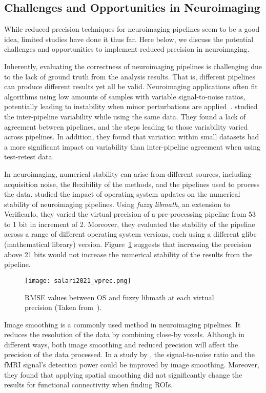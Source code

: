 \subsection{Challenges and Opportunities in Neuroimaging}
While reduced precision techniques for neuroimaging pipelines seem to be a
good idea, limited studies have done it thus far.
Here below, we discuss the potential challenges and opportunities to implement
reduced precision in neuroimaging.
	
Inherently, evaluating the correctness of neuroimaging pipelines is challenging due to the lack of ground truth from the analysis results.
That is, different pipelines can produce different results yet all be valid.
Neuroimaging applications often fit algorithms using low amounts of samples with variable
signal-to-noise ratios, potentially leading to instability when minor perturbations are applied~\cite{Kiar2020-uv}.
\cite{Li2021.12.01.470790} studied the inter-pipeline variability while using the same data.
They found a lack of agreement between pipelines, and the steps leading to those variability varied across pipelines.
In addition, they found that variation within small datasets had a more significant impact
on variability than inter-pipeline agreement when using test-retest data. 
	
In neuroimaging, numerical stability can arise from different sources, including
acquisition noise, the flexibility of the methods, and the pipelines used to process the data.
\cite{Salari2021-kd} studied the impact of operating system updates on
the numerical stability of neuroimaging pipelines.
Using \textit{fuzzy libmath}, an extension to Verificarlo, they varied the virtual
precision of a pre-processing pipeline from 53 to 1 bit in increment of 2.
Moreover, they evaluated the stability of the pipeline across a range of different
operating system versions, each using a different glibc (mathematical library) version.
Figure~\ref{fig:salari2021_vprec} suggests that increasing the precision above 21 bits
would not increase the numerical stability of the results from the pipeline.
\begin{figure}[h]
	\centering
	\texttt{[image: salari2021\_vprec.png]}
	\caption{RMSE values between OS and fuzzy libmath at each virtual precision (Taken from~\cite{Salari2021-kd}).}
	\label{fig:salari2021_vprec}
\end{figure}

Image smoothing is a commonly used method in neuroimaging pipelines.
It reduces the resolution of the data by combining close-by voxels.
Although in different ways, both image smoothing and reduced precision will affect
the precision of the data processed.
In a study by \cite{Molloy2014-oc}, the signal-to-noise ratio and
the fMRI signal's detection power could be improved by image smoothing. 
Moreover, they found that applying spatial smoothing did not significantly change the
results for functional connectivity when finding ROIs.
	
